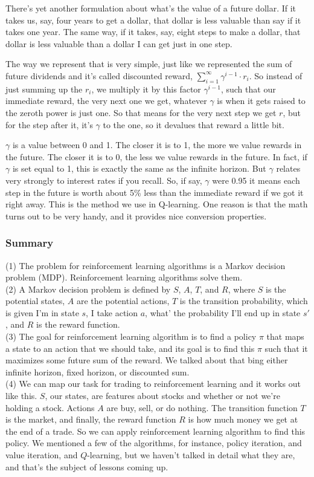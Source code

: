 \documentclass[12pt]{article}
\begin{document}
There's yet another formulation about what's the value of a future dollar. If it takes us, say, four years to get a dollar, that dollar is less valuable than say if it takes one year. The same way, if it takes, say, eight steps to make a dollar, that dollar is less valuable than a dollar I can get just in one step. 

The way we represent that is very simple, just like we represented the sum of future dividends and it's called discounted reward, $\sum_{i=1}^{\infty}\gamma^{i-1}\cdot r_i$. So instead of just summing up the $r_i$, we multiply it by this factor $\gamma^{i-1}$, such that our immediate reward, the very next one we get, whatever $\gamma$ is when it gets raised to the zeroth power is just one. So that means for the very next step we get $r$, but for the step after it, it's $\gamma$ to the one, so it devalues that reward a little bit. 

$\gamma$ is a value between 0 and 1. The closer it is to 1, the more we value rewards in the future. The closer it is to 0, the less we value rewards in the future. In fact, if $\gamma$ is set equal to 1, this is exactly the same as the infinite horizon. But $\gamma$ relates very strongly to interest rates if you recall. So, if say, $\gamma$ were 0.95 it means each step in the future is worth about 5\% less than the immediate reward if we got it right away. This is the method we use in Q-learning. One reason is that the math turns out to be very handy, and it provides nice conversion properties. 

\subsubsection{Summary}

\noindent
(1) The problem for reinforcement learning algorithms is a Markov decision problem (MDP). Reinforcement learning algorithms solve them. \\
(2) A Markov decision problem is defined by $S$, $A$, $T$, and $R$, where $S$ is the potential states, $A$ are the potential actions, $T$ is the transition probability, which is given I'm in state $s$, I take action $a$, what' the probability I'll end up in state $s'$, and $R$ is the reward function. \\
(3) The goal for reinforcement learning algorithm is to find a policy $\pi$ that maps a state to an action that we should take, and its goal is to find this $\pi$ such that it maximizes some future sum of the reward. We talked about that bing either infinite horizon, fixed horizon, or discounted sum. \\
(4) We can map our task for trading to reinforcement learning and it works out like this. $S$, our states, are features about stocks and whether or not we're holding a stock. Actions $A$ are buy, sell, or do nothing. The transition function $T$ is the market, and finally, the reward function $R$ is how much money we get at the end of a trade. So we can apply reinforcement learning algorithm to find this policy. We mentioned a few of the algorithms, for instance, policy iteration, and value iteration, and $Q$-learning, but we haven't talked in detail what they are, and that's the subject of lessons coming up. 
 
\end{document}

